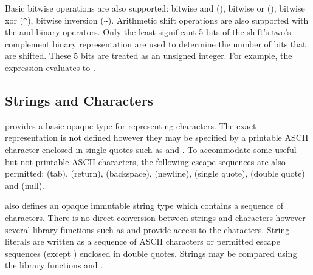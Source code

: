 \grammarend


Basic bitwise operations are also supported: bitwise and (\langtext{\&}),
bitwise or (\langtext{\|}), bitwise xor ({\tt \^{}}), bitwise inversion ({\tt \~{}}).
Arithmetic shift operations are also supported with the \langtext{<<} and
\langtext{>>} binary operators. Only the least significant 5 bits of the
shift's two's complement binary representation are used to determine the number
of bits that are shifted. These 5 bits are treated as an unsigned integer. For
example, the expression  evaluates to .

\subsection{Strings and Characters}

\langname{} provides a basic opaque type  for representing
characters. The exact representation is not defined however they may be
specified by a printable ASCII character enclosed in single quotes such as
 and . To accommodate some useful but not printable
ASCII characters, the following escape sequences are also permitted:
 (tab),  (return),
 (backspace), 
(newline),  (single quote),
 (double quote) and
 (null).

\langname{} also defines an opaque immutable string type  which
contains a sequence of characters. There is no direct conversion between strings
and characters however several library functions such as
 and  provide access to
the characters. String literals are written as a sequence of ASCII characters or
permitted  escape sequences (except ) enclosed in double quotes. Strings may be compared using the library
functions  and .


\grammarbegin
{}

\grammarend

